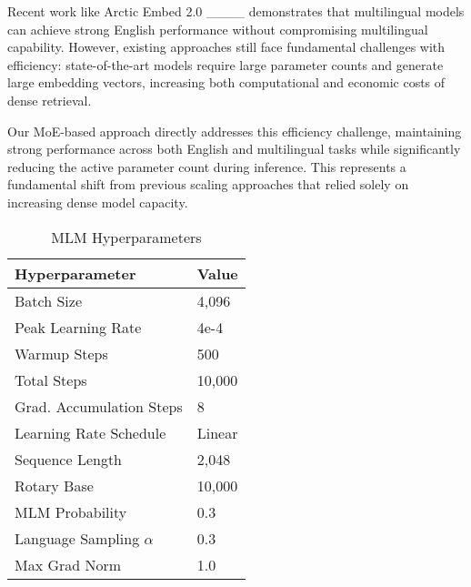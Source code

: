 Recent work like Arctic Embed 2.0 ____ demonstrates that multilingual models can achieve strong English performance without compromising multilingual capability. However, existing approaches still face fundamental challenges with efficiency: state-of-the-art models require large parameter counts and generate large embedding vectors, increasing both computational and economic costs of dense retrieval.

Our MoE-based approach directly addresses this efficiency challenge, maintaining strong performance across both English and multilingual tasks while significantly reducing the active parameter count during inference. This represents a fundamental shift from previous scaling approaches that relied solely on increasing dense model capacity.




\begin{table}[h]
\centering
\caption{MLM Hyperparameters}
\vspace{1.5pt}
\begin{tabular}{ll}
\hline
\textbf{Hyperparameter} & \textbf{Value} \\
\hline
Batch Size & 4,096 \\
Peak Learning Rate & 4e-4 \\
Warmup Steps & 500 \\
Total Steps & 10,000 \\
Grad. Accumulation Steps & 8 \\
Learning Rate Schedule & Linear \\
Sequence Length & 2,048 \\
Rotary Base & 10,000 \\
MLM Probability & 0.3 \\
Language Sampling $\alpha$ & 0.3 \\ 
Max Grad Norm & 1.0 \\
\hline
\end{tabular}
\label{tab:mlm_hyperparameters}
\end{table}

